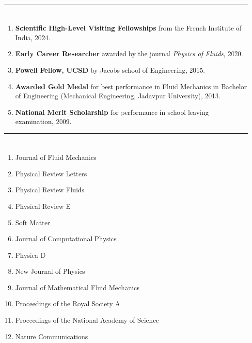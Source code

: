 \documentclass[10pt]{res} %
\begin{document}
\begin{resume}
\vspace*{-2mm}
\noindent\rule{\textwidth}{0.6pt}
\vspace*{-10mm}
\section{}
\vspace*{6mm}
\begin{enumerate}
	\item \textbf{Scientific High-Level Visiting Fellowships} from the French Institute of India, 2024.
	
	\item \textbf{Early Career Researcher} awarded by the journal \textit{Physics of Fluids}, 2020.
	
	\item \textbf{Powell Fellow, UCSD} by Jacobs school of Engineering, 2015.
	
	
	\item \textbf{Awarded Gold Medal} for best performance in Fluid Mechanics in Bachelor of Engineering (Mechanical Engineering, Jadavpur University), 2013.
	
	\item \textbf{National Merit Scholarship} for performance in school leaving examination, 2009.
\end{enumerate}

\newpage
\vspace*{-2mm}
\noindent\rule{\textwidth}{0.6pt}
\vspace*{-10mm}
\section{}
\vspace*{3mm}


\begin{multicols}{2}
	\begin{enumerate}
		\item Journal of Fluid Mechanics
		\item Physical Review Letters
		\item Physical Review Fluids
		\item Physical Review E
		\item Soft Matter
		\item Journal of Computational Physics
		\item Physica D
		\item New Journal of Physics
		\item Journal of Mathematical Fluid Mechanics
		\item Proceedings of the Royal Society A
		\item Proceedings of the National Academy of Science
		\item Nature Communications
	\end{enumerate}
\end{multicols}


\end{resume}
\end{document}
